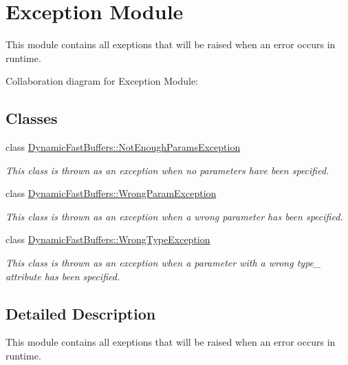 \hypertarget{group___e_x_c_e_p_t_i_o_n_m_o_d_u_l_e}{\section{Exception Module}
\label{group___e_x_c_e_p_t_i_o_n_m_o_d_u_l_e}
}


This module contains all exeptions that will be raised when an error occurs in runtime.  


Collaboration diagram for Exception Module\-:
\subsection*{Classes}
\begin{DoxyCompactItemize}
\item 
class \hyperlink{class_dynamic_fast_buffers_1_1_not_enough_params_exception}{Dynamic\-Fast\-Buffers\-::\-Not\-Enough\-Params\-Exception}
\begin{DoxyCompactList}\small\item\em This class is thrown as an exception when no parameters have been specified. \end{DoxyCompactList}\item 
class \hyperlink{class_dynamic_fast_buffers_1_1_wrong_param_exception}{Dynamic\-Fast\-Buffers\-::\-Wrong\-Param\-Exception}
\begin{DoxyCompactList}\small\item\em This class is thrown as an exception when a wrong parameter has been specified. \end{DoxyCompactList}\item 
class \hyperlink{class_dynamic_fast_buffers_1_1_wrong_type_exception}{Dynamic\-Fast\-Buffers\-::\-Wrong\-Type\-Exception}
\begin{DoxyCompactList}\small\item\em This class is thrown as an exception when a parameter with a wrong type\-\_\- attribute has been specified. \end{DoxyCompactList}\end{DoxyCompactItemize}


\subsection{Detailed Description}
This module contains all exeptions that will be raised when an error occurs in runtime. 